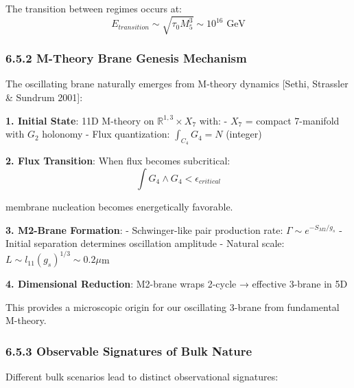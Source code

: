\documentclass[
  11pt,
]{report}
\begin{document}
The transition between regimes occurs at:
\[E_{transition} \sim \sqrt{\tau_0 M_5^3} \sim 10^{16} \text{ GeV}\]

\subsubsection{6.5.2 M-Theory Brane Genesis
Mechanism}\label{m-theory-brane-genesis-mechanism}

The oscillating brane naturally emerges from M-theory dynamics {[}Sethi,
Strassler \& Sundrum 2001{]}:

\textbf{1. Initial State}: 11D M-theory on
\(\mathbb{R}^{1,3} \times X_7\) with: - \(X_7\) = compact 7-manifold
with \(G_2\) holonomy - Flux quantization: \(\int_{C_4} G_4 = N\)
(integer)

\textbf{2. Flux Transition}: When flux becomes subcritical:
\[\int G_4 \wedge G_4 < \epsilon_{critical}\]

membrane nucleation becomes energetically favorable.

\textbf{3. M2-Brane Formation}: - Schwinger-like pair production rate:
\(\Gamma \sim e^{-S_{M2}/g_s}\) - Initial separation determines
oscillation amplitude - Natural scale:
\(L \sim l_{11}(g_s)^{1/3} \sim 0.2 \mu\)m

\textbf{4. Dimensional Reduction}: M2-brane wraps 2-cycle → effective
3-brane in 5D

This provides a microscopic origin for our oscillating 3-brane from
fundamental M-theory.

\subsubsection{6.5.3 Observable Signatures of Bulk
Nature}\label{observable-signatures-of-bulk-nature}

Different bulk scenarios lead to distinct observational signatures:
\end{document}
